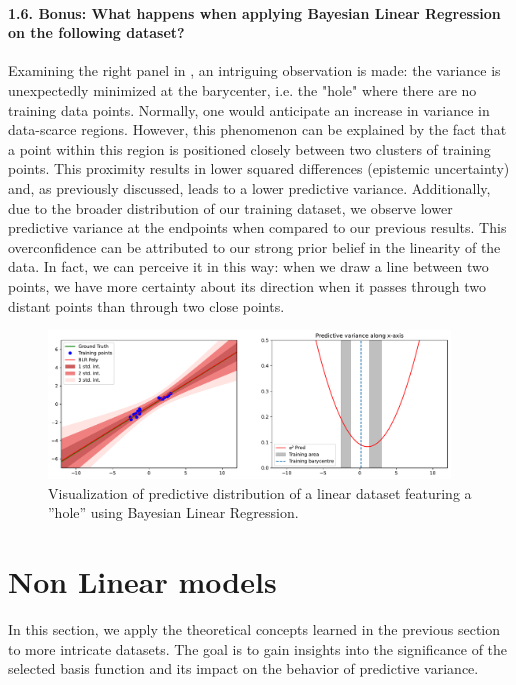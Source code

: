 \paragraph*{1.6. Bonus: What happens when applying Bayesian Linear Regression on the following dataset?}

Examining the right panel in , an intriguing observation is made: the variance is unexpectedly minimized at the barycenter, i.e. the "hole" where there are no training data points. Normally, one would anticipate an increase in variance in data-scarce regions. However, this phenomenon can be explained by the fact that a point within this region is positioned closely between two clusters of training points. This proximity results in lower squared differences (epistemic uncertainty) and, as previously discussed, leads to a lower predictive variance. Additionally, due to the broader distribution of our training dataset, we observe lower predictive variance at the endpoints when compared to our previous results. This overconfidence can be attributed to our strong prior belief in the linearity of the data. In fact, we can perceive it in this way: when we draw a line between two points, we have more certainty about its direction when it passes through two distant points than through two close points.

\begin{figure}[H]
    \centering
    \includegraphics[width=0.95\textwidth]{phi_linear_hole.pdf}
    \caption{Visualization of predictive distribution of a linear dataset featuring a ''hole'' using Bayesian Linear Regression.}
    \label{fig:phi_linear_hole}
\end{figure}

\section{Non Linear models}

In this section, we apply the theoretical concepts learned in the previous section to more intricate datasets. The goal is to gain insights into the significance of the selected basis function and its impact on the behavior of predictive variance.

